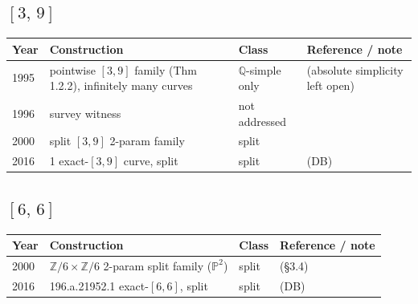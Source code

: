 \documentclass[10pt]{amsart}
\begin{document}
\subsection*{$[3,\,9]$}
\begin{longtable}{p{0.9cm} p{7.6cm} p{2.3cm} p{4.2cm}}
\hline Year & Construction & Class & Reference / note \\ \hline
1995 & pointwise $[3,9]$ family (Thm 1.2.2), infinitely many curves & $\mathbb{Q}$-simple only & \cite{Leprevost1995} (absolute simplicity left open)\\
1996 & survey witness & not addressed & \cite{Poonen1996}\\
2000 & split $[3,9]$ 2-param family & split & \cite{HLP2000}\\
2016 & 1 exact-$[3,9]$ curve, split & split & \cite{BSSVY} (DB)\\
\hline\end{longtable}
\subsection*{$[6,\,6]$}
\begin{longtable}{p{0.9cm} p{7.6cm} p{2.3cm} p{4.2cm}}
\hline Year & Construction & Class & Reference / note \\ \hline
2000 & $\mathbb{Z}/6 \times \mathbb{Z}/6$ 2-param split family ($\mathbb{P}^2$) & split & \cite{HLP2000} (\S3.4)\\
2016 & 196.a.21952.1 exact-$[6,6]$, split & split & \cite{BSSVY} (DB)\\
\hline\end{longtable}
\end{document}

